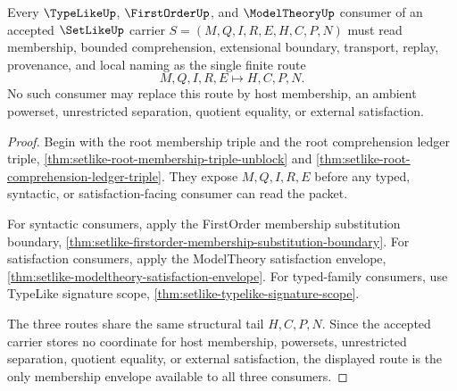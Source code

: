 \begin{theorem}
\label{thm:setlike-type-model-membership-envelope}
Every $\TypeLikeUp$, $\FirstOrderUp$, and $\ModelTheoryUp$ consumer of an accepted $\SetLikeUp$ carrier $S=(M,Q,I,R,E,H,C,P,N)$ must read membership, bounded comprehension, extensional boundary, transport, replay, provenance, and local naming as the single finite route
$$
M,Q,I,R,E \longmapsto H,C,P,N .
$$
No such consumer may replace this route by host membership, an ambient powerset, unrestricted separation, quotient equality, or external satisfaction.
\end{theorem}
\begin{proof}
Begin with the root membership triple and the root comprehension ledger triple, \autoref{thm:setlike-root-membership-triple-unblock} and \autoref{thm:setlike-root-comprehension-ledger-triple}. They expose $M,Q,I,R,E$ before any typed, syntactic, or satisfaction-facing consumer can read the packet.

For syntactic consumers, apply the FirstOrder membership substitution boundary, \autoref{thm:setlike-firstorder-membership-substitution-boundary}. For satisfaction consumers, apply the ModelTheory satisfaction envelope, \autoref{thm:setlike-modeltheory-satisfaction-envelope}. For typed-family consumers, use TypeLike signature scope, \autoref{thm:setlike-typelike-signature-scope}.

The three routes share the same structural tail $H,C,P,N$. Since the accepted carrier stores no coordinate for host membership, powersets, unrestricted separation, quotient equality, or external satisfaction, the displayed route is the only membership envelope available to all three consumers.
\end{proof}
